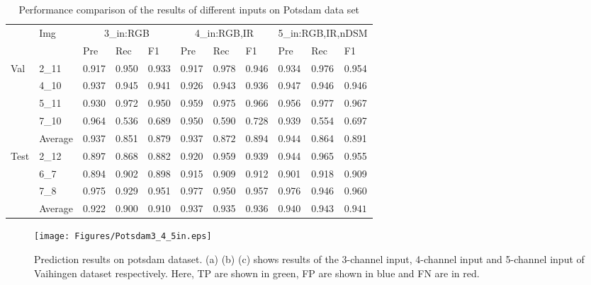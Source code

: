 \begin{table}[htbp]
    \caption {Performance comparison of the results of different inputs on Potsdam data set}
    \begin{center}
    \begin{tabular}{p{1.1cm}<{\centering}|p{1.1cm}<{\centering}|p{1.1cm}<{\centering}|p{1.1cm}<{\centering}|p{1.1cm}<{\centering}|p{1.1cm}<{\centering}|p{1.1cm}<{\centering}|p{1.1cm}<{\centering}|p{1.1cm}<{\centering}|p{1.1cm}<{\centering}|p{1.1cm}<{\centering}}
     \hline
    &\multirow{2}{*}{Img}&\multicolumn{3}{c}{3\_in:RGB} &\multicolumn{3}{|c|}{4\_in:RGB,IR}&\multicolumn{3}{c}{5\_in:RGB,IR,nDSM}\\
     \cline{3-11}
    && Pre &Rec & F1 &Pre &Rec &F1&Pre &Rec &F1\\
    \hline\hline
    \multirow{4}{*}{Val}&2\_11&0.917&0.950&0.933&0.917&0.978&0.946&0.934&0.976&0.954\\
    &4\_10&0.937&0.945&0.941&0.926&0.943&0.936&0.947&0.946&0.946\\
    &5\_11&0.930&0.972&0.950&0.959&0.975&0.966&0.956&0.977&0.967\\
    &7\_10&0.964&0.536&0.689&0.950&0.590&0.728&0.939&0.554&0.697\\
    \cline{2-11}
    &{Average}&0.937&0.851&0.879&0.937&$\bm{0.872}$&$\bm{0.894}$&$\bm{0.944}$&0.864&0.891\\
    \hline\hline
    \multirow{3}{*}{Test}&2\_12&0.897&0.868&0.882&0.920&0.959&0.939&0.944&0.965&0.955\\
    &6\_7&0.894&0.902&0.898&0.915&0.909&0.912&0.901&0.918&0.909\\
    &7\_8&0.975&0.929&0.951&0.977&0.950&0.957&0.976&0.946&0.960\\
    \cline{2-11}
    &{Average}&0.922&0.900&0.910&0.937&0.935&0.936&$\bm{0.940}$&$\bm{0.943}$&$\bm{0.941}$\\
    \hline\hline
   \end{tabular}
   \end{center}
   \end{table}

\begin{figure}
\centering
\texttt{[image: Figures/Potsdam3\_4\_5in.eps]}
\caption{Prediction results on potsdam dataset. (a) (b) (c) shows results of the 3-channel input, 4-channel input and 5-channel input of Vaihingen dataset respectively. Here, TP are shown in green, FP are shown in blue and FN are in red.}
\label{16}
\end{figure}

